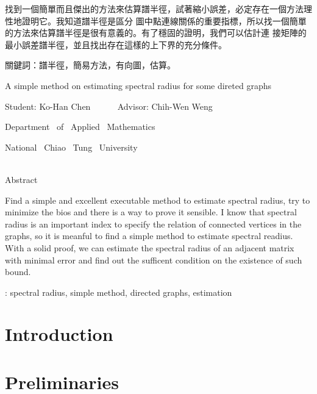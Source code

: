 \documentclass{article}
\renewcommand{\baselinestretch}{1.5} %
\theoremstyle{plain}
\theoremstyle{definition}
\begin{document}
 找到一個簡單而且傑出的方法來估算譜半徑，試著縮小誤差，必定存在一個方法理性地證明它。我知道譜半徑是區分
 圖中點連線關係的重要指標，所以找一個簡單的方法來估算譜半徑是很有意義的。有了穩固的證明，我們可以估計連
 接矩陣的最小誤差譜半徑，並且找出存在這樣的上下界的充分條件。\\
\bigskip

\noindent 關鍵詞：譜半徑，簡易方法，有向圖，估算。
\pagebreak



\begin{center}{\LARGE
A simple method on estimating spectral radius for some direted graphs
\bigskip\bigskip\bigskip}

{ \large
Student: Ko-Han Chen  ~~~~~ Advisor: Chih-Wen Weng \\
\Large

Department ~of~ Applied ~Mathematics
\bigskip

National~ Chiao ~Tung~ University
\bigskip\bigskip\bigskip\bigskip}\\
{\large Abstract}
\end{center}

Find a simple and excellent executable method
 to estimate spectral radius, try to minimize the bios and there is a way to prove it sensible.
 I know that spectral radius is an important index to specify the relation of connected vertices in
  the graphs, so it is meanful to find a simple method to estimate spectral readius. With a solid proof,
   we can estimate the spectral radius of an adjacent matrix with minimal error and find out the sufficent
  condition on the existence of such bound.

\bigskip


: spectral radius, simple method, directed graphs, estimation
\pagebreak


\renewcommand{\baselinestretch}{1.2}
\large
\tableofcontents


\pagebreak

\label{Introduction}

\section{Introduction}
\normalsize
{}

\section{Preliminaries}
    
\end{document}
